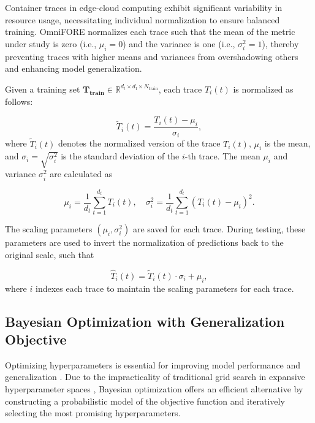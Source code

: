 Container traces in edge-cloud computing exhibit significant variability in resource usage, necessitating individual normalization to ensure balanced training. OmniFORE normalizes each trace such that the mean of the metric under study is zero (i.e., $\mu_i=0$) and the variance is one (i.e., $\sigma_i^2=1$), thereby preventing traces with higher means and variances from overshadowing others and enhancing model generalization.

Given a training set $\mathbf{T_{\text{train}}} \in \mathbb{R}^{d_t \times d_{\text{f}} \times N_{\text{train}}}$, each trace $T_i(t)$ is normalized as follows:

\begin{equation}
\tilde{T}_i(t) = \frac{T_i(t) - \mu_i}{\sigma_i},  
\end{equation}
where $\tilde{T}_i(t)$ denotes the normalized version of the trace $T_i(t)$, \(\mu_i\) is the mean, and \(\sigma_i = \sqrt{\sigma_i^2}\) is the standard deviation of the \(i\)-th trace. The mean \(\mu_i\) and variance \(\sigma_i^2\) are calculated as

\begin{equation}
\mu_i = \frac{1}{d_t} \sum_{t=1}^{d_t} T_i(t), \quad \sigma_i^2 = \frac{1}{d_t} \sum_{t=1}^{d_t} (T_i(t) - \mu_i)^2.
\end{equation}

The scaling parameters $(\mu_i, \sigma_i^2)$ are saved for each trace. During testing, these parameters are used to invert the normalization of predictions back to the original scale, such that

\begin{equation}
\hat{T}_i(t) = \tilde{T}_i(t) \cdot \sigma_i + \mu_i,
\end{equation}
where $i$ indexes each trace to maintain the scaling parameters for each trace.

\subsection{Bayesian Optimization with Generalization Objective}
\label{sec:BayesianOptimizationWithGeneralizationObjective}

Optimizing hyperparameters is essential for improving model performance and generalization \cite{hyperparamsdatasets}. Due to the impracticality of traditional grid search in expansive hyperparameter spaces \cite{gridsearchvsbayesian}, Bayesian optimization \cite{frazier2018tutorial} offers an efficient alternative by constructing a probabilistic model of the objective function and iteratively selecting the most promising hyperparameters.

